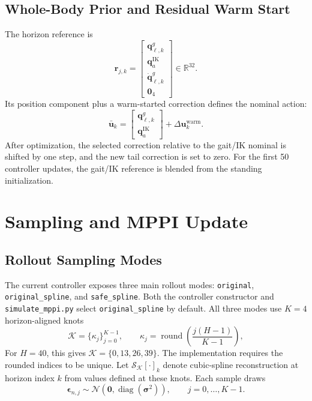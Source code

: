 \documentclass[11pt,a4paper]{article}
\newcommand{\R}{\mathbb{R}}
\newcommand{\diag}{\operatorname{diag}}
\newcommand{\code}[1]{\texttt{#1}}
\begin{document}
\subsection{Whole-Body Prior and Residual Warm Start}

The horizon reference is
\begin{equation}
  \bm{r}_{j,k}=
  \begin{bmatrix}
    \bm{q}^{g}_{\ell,k}\\
    \bm{q}^{\mathrm{IK}}_a\\
    \dot{\bm{q}}^{g}_{\ell,k}\\
    \bm{0}_4
  \end{bmatrix}
  \in\R^{32}.
\end{equation}
Its position component plus a warm-started correction defines the nominal
action:
\begin{equation}
  \bar{\bm{u}}_k=
  \begin{bmatrix}
    \bm{q}^{g}_{\ell,k}\\
    \bm{q}^{\mathrm{IK}}_a
  \end{bmatrix}
  +\Delta\bm{u}^{\mathrm{warm}}_k.
\end{equation}
After optimization, the selected correction relative to the gait/IK nominal
is shifted by one step, and the new tail correction is set to zero. For the
first 50 controller updates, the gait/IK reference is blended from the
standing initialization.

\section{Sampling and MPPI Update}

\subsection{Rollout Sampling Modes}

The current controller exposes three main rollout modes:
\code{original}, \code{original\_spline}, and \code{safe\_spline}. Both the
controller constructor and \code{simulate\_mppi.py} select
\code{original\_spline} by default. All three modes use $K=4$ horizon-aligned
knots
\begin{equation}
  \mathcal{K}=\{\kappa_j\}_{j=0}^{K-1},
  \qquad
  \kappa_j=
  \operatorname{round}\left(\frac{j(H-1)}{K-1}\right),
\end{equation}
For $H=40$, this gives $\mathcal{K}=\{0,13,26,39\}$. The implementation
requires the rounded indices to be unique. Let
$\mathcal{S}_{\mathcal{K}}[\cdot]_k$ denote cubic-spline reconstruction at
horizon index $k$ from values defined at these knots. Each sample draws
\begin{equation}
  \bm{\epsilon}_{n,j}
  \sim\mathcal{N}(\bm{0},\diag(\bm{\sigma}^2)),
  \qquad j=0,\ldots,K-1.
\end{equation}
\end{document}

